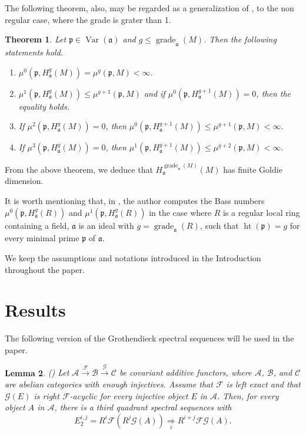 \documentclass[12pt,twoside, final]{amsart}
\numberwithin{equation}{section}
\newtheorem{thm}{Theorem}[section]
\newtheorem{lem}[thm]{Lemma}
\newtheorem{nota rem}[thm]{Notation and Remark}
\newtheorem{defen rem}[thm]{Definition and Remark}
\def\hei{\operatorname{ht}}
\def\grade{\operatorname{grade}}
\def\var{\operatorname{Var}}
\newcommand{\p}{\mathfrak{p}}
\newcommand{\fa}{\mathfrak{a}}
\begin{document}
 The following theorem, also,  may be regarded as a generalization of  \cite[Theorem 2. 1]{bns}, to the non regular case, where the grade is grater than 1.
 \begin{thm}%
 Let $\p\in \var(\fa)$ and   $g\leq \grade_{\fa}(M)$. Then the following statements hold.
\begin{enumerate}
    \item $\mu^0(\p, H^g_{\fa}(M))= \mu^g(\p, M)< \infty$.
    \item $\mu^1(\p, H^g_{\fa}(M))\leq \mu^{g+ 1}(\p, M)$ and if $\mu^0(\p, H^{g+ 1}_{\fa}(M))= 0$, then the equality holds.
    \item If $\mu^2(\p, H^g_{\fa}(M))= 0$, then $\mu^0(\p, H^{g+ 1}_{\fa}(M)) \leq \mu^{g+ 1}(\p, M)< \infty$.
    \item If $\mu^3(\p, H^g_{\fa}(M))= 0$, then $\mu^1(\p, H^{g+ 1}_{\fa}(M)) \leq \mu^{g+ 2}(\p, M)< \infty$.
\end{enumerate}    
 \end{thm}
From the above theorem, we deduce that $H^{\grade_{\fa}(M)}_{\fa}(M)$ has ﬁnite Goldie dimension.

It is worth mentioning  that, in \cite{le}, the author computes the Bass numbers $\mu^0(\p, H^g_{\fa}(R))$ and $\mu^1(\p, H^g_{\fa}(R))$ in the case where  $R$ is a regular local ring containing a field, $\fa$ is  an ideal with $g= \grade_{\fa}(R)$, such that
 $\hei(\p)= g$ for every minimal prime $\p$ of $\fa$.
 
We keep the assumptions and notations introduced in the Introduction throughout the paper.
\section{Results}
 
The following version of the Grothendieck spectral sequences will be used in the paper.
\begin{lem} (\cite[Theorem 10. 47]{r}) \label{rot10.47}
      Let $\mathcal{A}\stackrel{\mathcal{F}}{ \rightarrow} \mathcal{B} \stackrel{\mathcal{G}}{ \rightarrow}\mathcal{C}$
  be covariant additive functors, where $\mathcal{A}$, $\mathcal{B}$, and $\mathcal{C}$ are abelian categories with enough injectives. Assume that $\mathcal{F}$ is left exact and that $\mathcal{G}(E)$ is right $\mathcal{F}$-acyclic for every
injective object $E$ in $\mathcal{A}$. Then, for every object $A$ in $\mathcal{A}$, there is a third quadrant spectral sequences with
\[E_2^{i, j}= R^i\mathcal{F}(R^j\mathcal{G}(A))\underset{i}{\Rightarrow}R^{i+ j}\mathcal{F}\mathcal{G} (A).\]
\end{lem}
\end{document}
